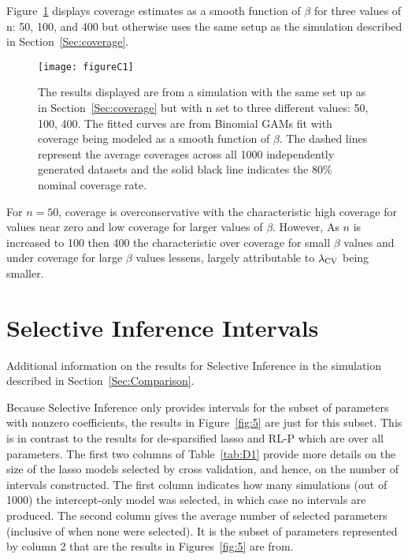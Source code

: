Figure~\ref{fig:C1} displays coverage estimates as a smooth function of $\beta$ for three values of n: 50, 100, and 400 but otherwise uses the same setup as the simulation described in Section~\ref{Sec:coverage}.

\begin{figure}[hbtp]
  \begin{center}
  \texttt{[image: figureC1]}
  \caption{\label{fig:C1} The results displayed are from a simulation with the same set up as in Section~\ref{Sec:coverage} but with n set to three different values: 50, 100, 400. The fitted curves are from Binomial GAMs fit with coverage being modeled as a smooth function of $\beta$. The dashed lines represent the average coverages across all 1000 independently generated datasets and the solid black line indicates the 80\% nominal coverage rate.}
  \end{center}
\end{figure}

For $n = 50$, coverage is overconservative with the characteristic high coverage for values near zero and low coverage for larger values of $\beta$. However, As $n$ is increased to 100 then 400 the characteristic over coverage for small $\beta$ values and under coverage for large $\beta$ values lessens, largely attributable to $\lambda_{\textrm{CV}}$ being smaller.

\clearpage

\section{Selective Inference Intervals}\label{Sup:si_int_info}


\begin{table}[hb]
  \singlespace
  \centering
  
  \caption{Additional information on the results for Selective Inference in the simulation described in Section~\ref{Sec:Comparison}.}
  \label{tab:D1}
\end{table}


Because Selective Inference only provides intervals for the subset of parameters with nonzero coefficients, the results in Figure~\ref{fig:5} are just for this subset. This is in contrast to the results for de-sparsified lasso and RL-P which are over all parameters. The first two columns of Table~\ref{tab:D1} provide more details on the size of the lasso models selected by cross validation, and hence, on the number of intervals constructed. The first column indicates how many simulations (out of 1000) the intercept-only model was selected, in which case no intervals are produced. The second column gives the average number of selected parameters (inclusive of when none were selected). It is the subset of parameters represented by column 2 that are the results in Figures~\ref{fig:5} are from.

